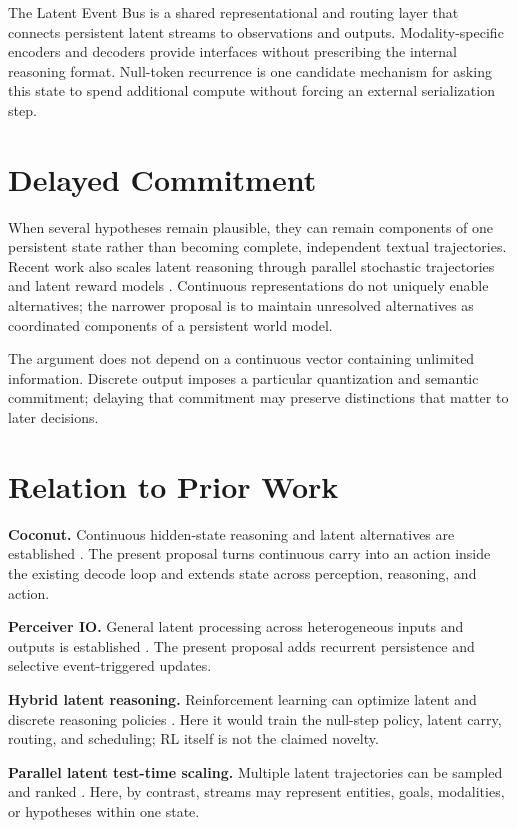 \documentclass[10pt,twocolumn]{article}
\begin{document}
The Latent Event Bus is a shared representational and routing layer that connects persistent latent streams to observations and outputs. Modality-specific encoders and decoders provide interfaces without prescribing the internal reasoning format. Null-token recurrence is one candidate mechanism for asking this state to spend additional compute without forcing an external serialization step.

\section{Delayed Commitment}

When several hypotheses remain plausible, they can remain components of one persistent state rather than becoming complete, independent textual trajectories. Recent work also scales latent reasoning through parallel stochastic trajectories and latent reward models \cite{you2026parallel}. Continuous representations do not uniquely enable alternatives; the narrower proposal is to maintain unresolved alternatives as coordinated components of a persistent world model.

The argument does not depend on a continuous vector containing unlimited information. Discrete output imposes a particular quantization and semantic commitment; delaying that commitment may preserve distinctions that matter to later decisions.

\section{Relation to Prior Work}

\textbf{Coconut.} Continuous hidden-state reasoning and latent alternatives are established \cite{hao2024coconut}. The present proposal turns continuous carry into an action inside the existing decode loop and extends state across perception, reasoning, and action.

\textbf{Perceiver IO.} General latent processing across heterogeneous inputs and outputs is established \cite{jaegle2021perceiver}. The present proposal adds recurrent persistence and selective event-triggered updates.

\textbf{Hybrid latent reasoning.} Reinforcement learning can optimize latent and discrete reasoning policies \cite{yue2025hybrid}. Here it would train the null-step policy, latent carry, routing, and scheduling; RL itself is not the claimed novelty.

\textbf{Parallel latent test-time scaling.} Multiple latent trajectories can be sampled and ranked \cite{you2026parallel}. Here, by contrast, streams may represent entities, goals, modalities, or hypotheses within one state.
\end{document}
